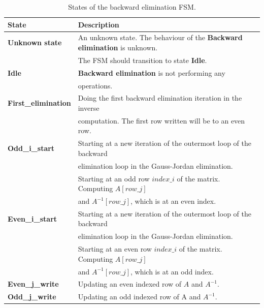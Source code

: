 \begin{table}[H]
\centering
 \resizebox{1\textwidth}{!}
{\begin{tabular}{l|l}
State                                                                                    & Description                                                                                   \\
\hline
\textbf{Unknown state}                                                                   & An unknown state. The behaviour of the \textbf{Backward elimination} is unknown.                                     \\
&The FSM should transition to state \textbf{Idle}.\\
\textbf{Idle}                                                                            & \textbf{Backward elimination} is not performing any                                           \\
 &operations.\\
\textbf{First\_elimination} & Doing the first backward elimination iteration in the inverse    \\
& computation. The first row written will be to an even row.\\
\textbf{Odd\_i\_start}                                                            & Starting at a new iteration of the outermost loop of the backward  
\\
&elimination loop in the Gauss-Jordan elimination.\\
&
Starting at an odd row $index\_i$ of the matrix. Computing $A[row\_j]$       \\
&and $A^{-1}[row\_j]$, which is at an even index.\\

\textbf{Even\_i\_start}                                                            & Starting at a new iteration of the outermost loop of the backward 
\\
&elimination loop in the Gauss-Jordan elimination.\\
&
Starting at an even row $index\_i$ of the matrix. Computing $A[row\_j]$   \\
&and $A^{-1}[row\_j]$, which is at an odd index.\\

\textbf{Even\_j\_write}                                                           & Updating an even indexed row of $A$ and $A^{-1}$.       \\
\textbf{Odd\_j\_write}                                                                  & Updating an odd indexed row of A and $A^{-1}$.   
\end{tabular}}
\caption{States of the backward elimination FSM.}
\label{tab:fsm_backward_elimination}
\end{table}

